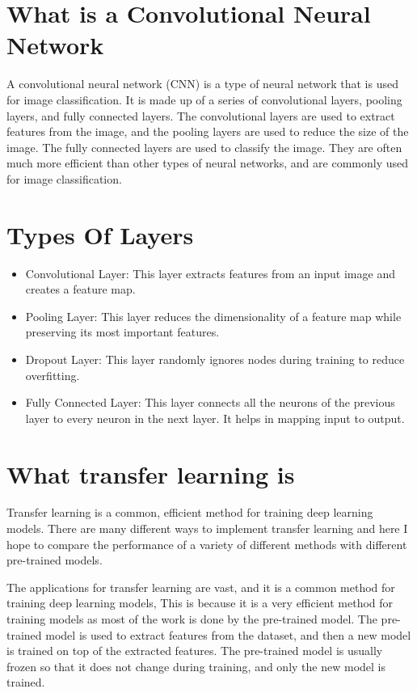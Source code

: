 \documentclass[]{final_report}
\begin{document}
\section{What is a Convolutional Neural Network}
A convolutional neural network (CNN) is a type of neural network that is used for image classification.
It is made up of a series of convolutional layers, pooling layers, and fully connected layers.
The convolutional layers are used to extract features from the image, and the pooling layers are used to reduce the size of the image.
The fully connected layers are used to classify the image.
They are often much more efficient than other types of neural networks, and are commonly used for image classification.


\section{Types Of Layers}

\begin{itemize}
  \item Convolutional Layer: This layer extracts features from an input image and creates a feature map.

  \item  Pooling Layer: This layer reduces the dimensionality of a feature map while preserving its most important features.
  
  \item  Dropout Layer: This layer randomly ignores nodes during training to reduce overfitting.
  
  \item  Fully Connected Layer: This layer connects all the neurons of the previous layer to every neuron in the next layer. It helps in mapping input to output.
\end{itemize}



\section{What transfer learning is}
Transfer learning is a common, efficient method for training deep learning models.
There are many different ways to implement transfer learning and here I hope to compare the performance
of a variety of different methods with different pre-trained models.

The applications for transfer learning are vast, and it is a common method for training deep learning models,
This is because it is a very efficient method for training models as most of the work is done by the pre-trained model.
The pre-trained model is used to extract features from the dataset, and then a new model is trained on top of the extracted features.
The pre-trained model is usually frozen so that it does not change during training, and only the new model is trained.
\end{document}
